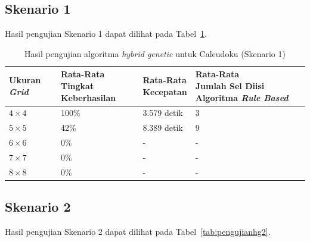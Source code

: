\subsection{Skenario 1}
\label{sec:skenario1}

Hasil pengujian Skenario 1 dapat dilihat pada Tabel~\ref{tab:pengujianhg1}.

\begin{table}
\centering
\captionsetup{justification=centering}
\caption[Hasil pengujian algoritma \textit{hybrid genetic} untuk Calcudoku (Skenario 1)]{Hasil pengujian algoritma \textit{hybrid genetic} untuk Calcudoku (Skenario 1)}
\begin{tabular}{| l | l | l | l |}
\hline
Ukuran \textit{Grid} & \makecell[l]{Rata-Rata \\ Tingkat Keberhasilan} & \makecell[l]{Rata-Rata \\ Kecepatan} & \makecell[l]{Rata-Rata \\ Jumlah Sel Diisi Algoritma \textit{Rule Based}} \\
\hline \hline
\begin{math}4 \times 4\end{math} & 100\% & 3.579 detik & 3 \\
\hline
\begin{math}5 \times 5\end{math} & 42\% & 8.389 detik & 9 \\
\hline
\begin{math}6 \times 6\end{math} & 0\% & - & - \\
\hline
\begin{math}7 \times 7\end{math} & 0\% & - & - \\
\hline
\begin{math}8 \times 8\end{math} & 0\% & - & - \\
\hline
\end{tabular}
\label{tab:pengujianhg1}
\end{table}

\clearpage

\subsection{Skenario 2}
\label{sec:skenario2}

Hasil pengujian Skenario 2 dapat dilihat pada Tabel~\ref{tab:pengujianhg2}.

